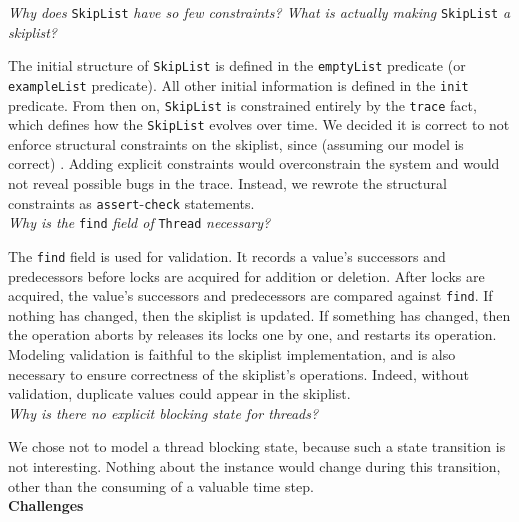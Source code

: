 \documentclass[12pt]{article}
\begin{document}
\noindent
\emph{Why does} \verb|SkipList| \emph{have so few constraints? What is actually making} \verb|SkipList| \emph{a skiplist?}

The initial structure of \verb|SkipList| is defined in the \verb|emptyList| predicate (or \verb|exampleList| predicate). All other initial information is defined in the \verb|init| predicate. From then on, \verb|SkipList| is constrained entirely by the \verb|trace| fact, which defines how the \verb|SkipList| evolves over time. We decided it is correct to not enforce structural constraints on the skiplist, since (assuming our model is correct) . Adding explicit constraints would overconstrain the system and would not reveal possible bugs in the trace. Instead, we rewrote the structural constraints as \verb|assert|-\verb|check| statements. \\

\noindent
\emph{Why is the} \verb|find| \emph{field of} \verb|Thread| \emph{necessary?}

The \verb|find| field is used for validation. It records a value's successors and predecessors before locks are acquired for addition or deletion. After locks are acquired, the value's successors and predecessors are compared against \verb|find|. If nothing has changed, then the skiplist is updated. If something has changed, then the operation aborts by releases its locks one by one, and restarts its operation. Modeling validation is faithful to the skiplist implementation, and is also necessary to ensure correctness of the skiplist's operations. Indeed, without validation, duplicate values could appear in the skiplist. \\

\noindent
\emph{Why is there no explicit blocking state for threads?}

We chose not to model a thread blocking state, because such a state transition is not interesting. Nothing about the instance would change during this transition, other than the consuming of a valuable time step. \\

\noindent
\textbf{Challenges}
\end{document}
